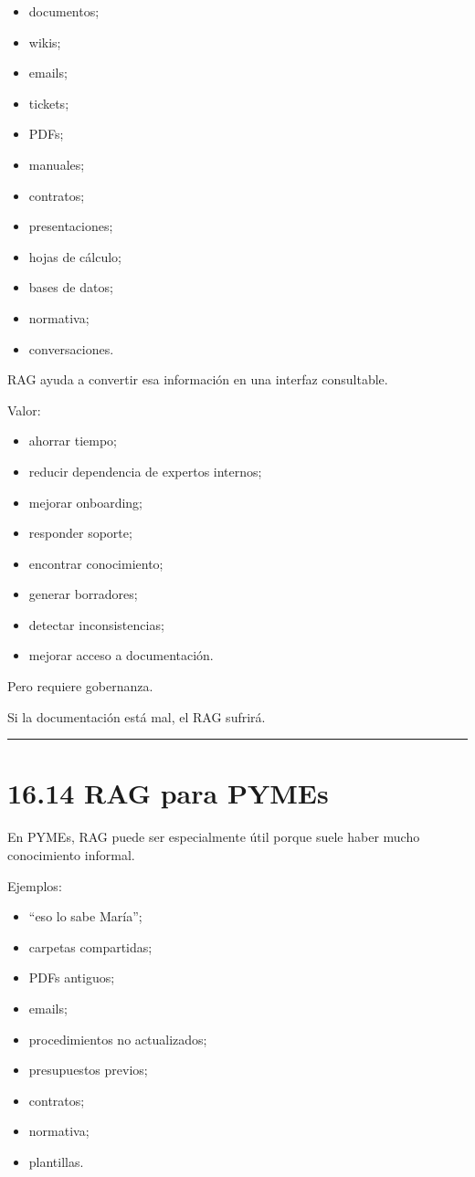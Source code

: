 \begin{itemize}
\tightlist
\item
  documentos;
\item
  wikis;
\item
  emails;
\item
  tickets;
\item
  PDFs;
\item
  manuales;
\item
  contratos;
\item
  presentaciones;
\item
  hojas de cálculo;
\item
  bases de datos;
\item
  normativa;
\item
  conversaciones.
\end{itemize}

RAG ayuda a convertir esa información en una interfaz consultable.

Valor:

\begin{itemize}
\tightlist
\item
  ahorrar tiempo;
\item
  reducir dependencia de expertos internos;
\item
  mejorar onboarding;
\item
  responder soporte;
\item
  encontrar conocimiento;
\item
  generar borradores;
\item
  detectar inconsistencias;
\item
  mejorar acceso a documentación.
\end{itemize}

Pero requiere gobernanza.

Si la documentación está mal, el RAG sufrirá.

\begin{center}\rule{0.5\linewidth}{0.5pt}\end{center}

\section{16.14 RAG para PYMEs}\label{rag-para-pymes}

En PYMEs, RAG puede ser especialmente útil porque suele haber mucho
conocimiento informal.

Ejemplos:

\begin{itemize}
\tightlist
\item
  ``eso lo sabe María'';
\item
  carpetas compartidas;
\item
  PDFs antiguos;
\item
  emails;
\item
  procedimientos no actualizados;
\item
  presupuestos previos;
\item
  contratos;
\item
  normativa;
\item
  plantillas.
\end{itemize}

